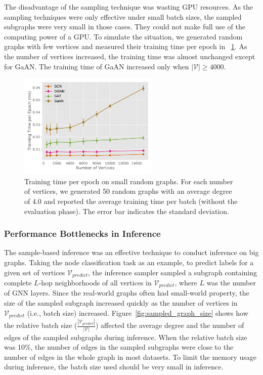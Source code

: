 The disadvantage of the sampling technique was wasting GPU resources.
%
As the sampling techniques were only effective under small batch sizes, the sampled subgraphs were very small in those cases.
%
They could not make full use of the computing power of a GPU.
%
To simulate the situation, we generated random graphs with few vertices and measured their training time per epoch in \figurename~\ref{fig:exp_small_graph_train_time}.
%
As the number of vertices increased, the training time was almost unchanged except for GaAN.
%
The training time of GaAN increased only when $|\mathcal{V}| \geq 4000$.

\begin{figure}[H]
    \centering
    \includegraphics[height=5cm]{figs/experiments/exp_small_graph_train_time.pdf}
    \caption{Training time per epoch on small random graphs. For each number of vertices, we generated 50 random graphs with an average degree of 4.0 and reported the average training time per batch (without the evaluation phase). The error bar indicates the standard deviation.}
    \label{fig:exp_small_graph_train_time}
\end{figure}

\subsubsection{Performance Bottlenecks in Inference}

The sample-based inference was an effective technique to conduct inference on big graphs.
%
Taking the node classification task as an example, to predict labels for a given set of vertices $\mathcal{V}_{predict}$, the inference sampler sampled a subgraph containing complete $L$-hop neighborhoods of all vertices in $\mathcal{V}_{predict}$, where $L$ was the number of GNN layers.
%
Since the real-world graphs often had small-world property, the size of the sampled subgraph increased quickly as the number of vertices in $\mathcal{V}_{predict}$ (i.e., batch size) increased.
%
Figure~\ref{fig:sampled_graph_size} shows how the relative batch size ($\frac{|\mathcal{V}_{predict}|}{|\mathcal{V}|}$) affected the average degree and the number of edges of the sampled subgraphs during inference.
%
When the relative batch size was 10\%, the number of edges in the sampled subgraphs were close to the number of edges in the whole graph in most datasets.
%
To limit the memory usage during inference, the batch size used should be very small in inference.

